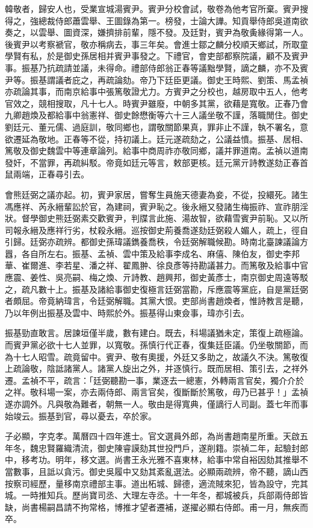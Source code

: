\begin{pinyinscope}
韓敬者，歸安人也，受業宣城湯賓尹。賓尹分校會試，敬卷為他考官所棄。賓尹搜得之，強總裁侍郎蕭雲舉、王圖錄為第一。榜發，士論大譁。知貢舉侍郎吳道南欲奏之，以雲舉、圖資深，嫌擠排前輩，隱不發。及廷對，賓尹為敬夤緣得第一人。後賓尹以考察褫官，敬亦稱病去，事三年矣。會進士鄒之麟分校順天鄉試，所取童學賢有私，於是御史孫居相并賓尹事發之。下禮官，會吏部都察院議，顧不及賓尹事。振基乃抗疏請並議，未得命。禮部侍郎翁正春等議黜學賢，謫之麟，亦不及賓尹等。振基謂議者庇之，再疏論劾。帝乃下廷臣更議。御史王時熙、劉策、馬孟禎亦疏論其事，而南京給事中張篤敬證尤力。方賓尹之分校也，越房取中五人，他考官效之，競相搜取，凡十七人。時賓尹雖廢，中朝多其黨，欲藉是寬敬。正春乃會九卿趙煥及都給事中翁憲祥、御史餘懋衡等六十三人議坐敬不謹，落職閒住。御史劉廷元、董元儒、過庭訓，敬同鄉也，謂敬關節果真，罪非止不謹，執不署名，意欲遷延為敬地。正春等不從，持初議上。廷元遂疏劾之，公議益憤。振基、居相、篤敬及御史魏雲中等連章論列。給事中商周祚亦敬同鄉，議并罪道南。孟禎以道南發奸，不當罪，再疏糾駁。帝竟如廷元等言，敕部更核。廷元黨亓詩教遂劾正春首鼠兩端，正春尋引去。

會熊廷弼之議亦起。初，賓尹家居，嘗奪生員施天德妻為妾，不從，投繯死。諸生馮應祥、芮永縉輩訟於官，為建祠，賓尹恥之。後永縉又發諸生梅振祚、宣祚朋淫狀。督學御史熊廷弼素交歡賓尹，判牒言此施、湯故智，欲藉雪賓尹前恥。又以所司報永縉及應祥行劣，杖殺永縉。巡按御史荊養喬遂劾廷弼殺人媚人，疏上，徑自引歸。廷弼亦疏辨。都御史孫瑋議鐫養喬秩，令廷弼解職候勘。時南北臺諫議論方囂，各自所左右。振基、孟禎、雲中策及給事李成名、麻僖、陳伯友，御史李邦華、崔爾進、李若星、潘之祥、翟鳳翀、徐良彥等持勘議甚力。而篤敬及給事中官應震、姜性、吳亮嗣、梅之煥、亓詩教、趙興邦，御史黃彥士，南京御史周遠等駁之，疏凡數十上。振基及諸給事御史復極言廷弼當勘，斥應震等黨庇，自是黨廷弼者頗屈。帝竟納瑋言，令廷弼解職。其黨大恨。吏部尚書趙煥者，惟詩教言是聽，乃以年例出振基及雲中、時熙於外。振基得山東僉事，瑋亦引去。

振基勁直敢言。居諫垣僅半歲，數有建白。既去，科場議猶未定，策復上疏極論。而賓尹黨必欲十七人並罪，以寬敬。孫慎行代正春，復集廷臣議。仍坐敬關節，而為十七人昭雪。疏竟留中。賓尹、敬有奧援，外廷又多助之，故議久不決。篤敬復上疏論敬，陰詆諸黨人。諸黨人旋出之外，并逐慎行。既而居相、策引去，之祥外遷。孟禎不平，疏言：「廷弼聽勘一事，業逐去一總憲，外轉兩言官矣，獨介介於之祥。敬科場一案，亦去兩侍郎、兩言官矣，復斷斷於篤敬，毋乃已甚乎！」孟禎遂亦調外。凡與敬為難者，朝無一人。敬由是得寬典，僅謫行人司副。蓋七年而事始竣云。振基到官，尋以憂去，卒於家。

子必顯，字克孝。萬曆四十四年進士。官文選員外郎，為尚書趙南星所重。天啟五年冬，魏忠賢羅織清流，御史陳睿謨劾其世投門戶，遂削籍。崇禎二年，起驗封郎中，移考功。明年，移文選。尚書王永光雅不喜東林，給事中常自裕因劾其推舉不當數事，且詆以貪污。御史吳履中又劾其紊亂選法。必顯兩疏辨，帝不聽，謫山西按察司經歷，量移南京禮部主事。道出柘城、歸德，適流賊來犯，皆為設守，完其城。一時推知兵。歷尚寶司丞、大理左寺丞。十一年冬，都城被兵，兵部兩侍郎皆缺，尚書楊嗣昌請不拘常格，博推才望者遷補，遂擢必顯右侍郎。甫一月，無疾而卒。


\end{pinyinscope}
